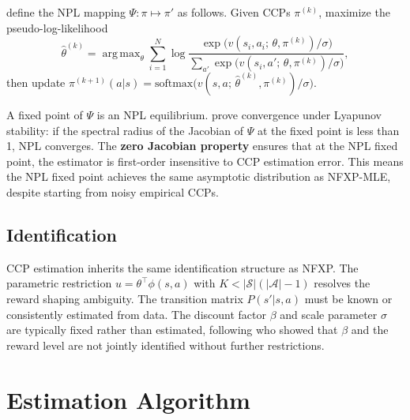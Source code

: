 \documentclass[11pt]{article}
\DeclareMathOperator*{\argmax}{arg\,max}
\begin{document}
\citet{aguirregabiriaMira2002} define the NPL mapping $\Psi: \pi \mapsto \pi'$ as follows. Given CCPs $\pi^{(k)}$, maximize the pseudo-log-likelihood
\begin{equation}
\label{eq:pseudo_ll}
\hat\theta^{(k)} = \argmax_\theta \sum_{i=1}^N \log \frac{\exp\bigl(v(s_i, a_i;\, \theta, \pi^{(k)})/\sigma\bigr)}{\sum_{a'} \exp\bigl(v(s_i, a';\, \theta, \pi^{(k)})/\sigma\bigr)},
\end{equation}
then update $\pi^{(k+1)}(a|s) = \text{softmax}\bigl(v(s,a;\, \hat\theta^{(k)}, \pi^{(k)})/\sigma\bigr)$.

A fixed point of $\Psi$ is an NPL equilibrium. \citet{aguirregabiriaMira2002} prove convergence under Lyapunov stability: if the spectral radius of the Jacobian of $\Psi$ at the fixed point is less than 1, NPL converges. The \textbf{zero Jacobian property} ensures that at the NPL fixed point, the estimator is first-order insensitive to CCP estimation error. This means the NPL fixed point achieves the same asymptotic distribution as NFXP-MLE, despite starting from noisy empirical CCPs.

\subsection{Identification}

CCP estimation inherits the same identification structure as NFXP. The parametric restriction $u = \theta^\top \phi(s,a)$ with $K < |\mathcal{S}|(|\mathcal{A}|-1)$ resolves the reward shaping ambiguity. The transition matrix $P(s'|s,a)$ must be known or consistently estimated from data. The discount factor $\beta$ and scale parameter $\sigma$ are typically fixed rather than estimated, following \citet{magnacThesmar2002} who showed that $\beta$ and the reward level are not jointly identified without further restrictions.


\section{Estimation Algorithm}
\end{document}
